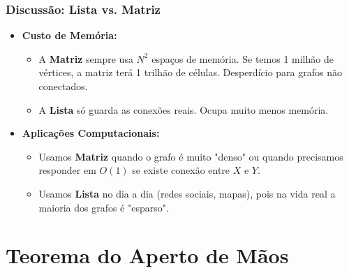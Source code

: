 \documentclass[9pt]{beamer}
\begin{document}
\begin{frame}
    \frametitle{Discussão: Lista vs. Matriz}
    \begin{itemize}
        \item \textbf{Custo de Memória:} 
        \begin{itemize}
            \item A \textbf{Matriz} sempre usa $N^2$ espaços de memória. Se temos 1 milhão de vértices, a matriz terá 1 trilhão de células. Desperdício para grafos não conectados.
            \item A \textbf{Lista} só guarda as conexões reais. Ocupa muito menos memória.
        \end{itemize}
        \item \textbf{Aplicações Computacionais:}
        \begin{itemize}
            \item Usamos \textbf{Matriz} quando o grafo é muito "denso" ou quando precisamos responder em $O(1)$ se existe conexão entre $X$ e $Y$.
            \item Usamos \textbf{Lista} no dia a dia (redes sociais, mapas), pois na vida real a maioria dos grafos é "esparso".
        \end{itemize}
    \end{itemize}
\end{frame}

\section{Teorema do Aperto de Mãos}
\end{document}
